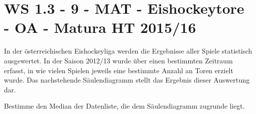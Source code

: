 \section{WS 1.3 - 9 - MAT - Eishockeytore - OA - Matura HT 2015/16}

\begin{beispiel}[WS 1.3]{1} %
In der österreichischen Eishockeyliga werden die Ergebnisse aller Spiele statistisch ausgewertet. In der Saison 2012/13 wurde über einen bestimmten Zeitraum erfasst, in wie vielen Spielen jeweils eine bestimmte Anzahl an Toren erzielt wurde. Das nachstehende Säulendiagramm stellt das Ergebnis dieser Auswertung dar.


\begin{center}
\end{center}


Bestimme den Median der Datenliste, die dem Säulendiagramm zugrunde liegt.


\end{beispiel}